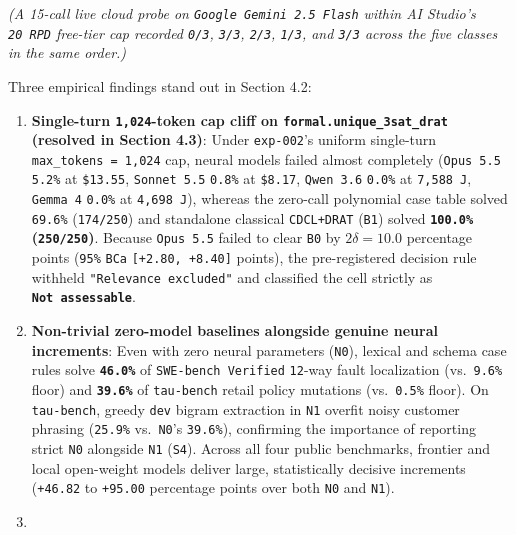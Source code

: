 \documentclass[10pt,letterpaper]{article}
\providecommand{\tightlist}{\setlength{\itemsep}{1pt}\setlength{\parskip}{0pt}}
\begin{document}
\emph{(A 15-call live cloud probe on \texttt{Google\ Gemini\ 2.\allowbreak{}5\ Flash}
within AI Studio's \texttt{20\ RPD} free-tier cap recorded \texttt{0/3},
\texttt{3/3}, \texttt{2/3}, \texttt{1/3}, and \texttt{3/3} across the
five classes in the same order.)}

Three empirical findings stand out in Section 4.2:

\begin{enumerate}
\def\labelenumi{\arabic{enumi}.}
\tightlist
\item
  \textbf{Single-turn \texttt{1,024}-token cap cliff on
  \texttt{formal.\allowbreak{}unique\_\allowbreak{}3sat\_\allowbreak{}drat} (resolved in Section 4.3)}: Under
  \texttt{exp-002}'s uniform single-turn \texttt{max\_\allowbreak{}tokens\ =\ 1,\allowbreak{}024}
  cap, neural models failed almost completely (\texttt{Opus\ 5.5}
  \texttt{5.2\%} at \texttt{\$13.55}, \texttt{Sonnet\ 5.\allowbreak{}5}
  \texttt{0.8\%} at \texttt{\$8.17}, \texttt{Qwen\ 3.6} \texttt{0.0\%}
  at \texttt{7,588\ J}, \texttt{Gemma\ 4} \texttt{0.0\%} at
  \texttt{4,698\ J}), whereas the zero-call polynomial case table solved
  \texttt{69.6\%} (\texttt{174/250}) and standalone classical
  \texttt{CDCL+DRAT} (\texttt{B1}) solved \textbf{\texttt{100.0\%}
  (\texttt{250/250})}. Because \texttt{Opus\ 5.5} failed to clear
  \texttt{B0} by \(2\delta = 10.0\) percentage points (\texttt{95\%}
  \texttt{BCa} \texttt{{[}+2.80,\ +8.40{]}} points), the pre-registered
  decision rule withheld \texttt{"Relevance\ excluded"} and classified
  the cell strictly as \textbf{\texttt{Not\ assessable}}.
\item
  \textbf{Non-trivial zero-model baselines alongside genuine neural
  increments}: Even with zero neural parameters (\texttt{N0}), lexical
  and schema case rules solve \textbf{\texttt{46.0\%}} of
  \texttt{SWE-\allowbreak{}bench\ Verified} \texttt{12}-way fault localization
  (vs.~\texttt{9.6\%} floor) and \textbf{\texttt{39.6\%}} of
  \texttt{tau-bench} retail policy mutations (vs.~\texttt{0.5\%} floor).
  On \texttt{tau-bench}, greedy \texttt{dev} bigram extraction in
  \texttt{N1} overfit noisy customer phrasing (\texttt{25.9\%}
  vs.~\texttt{N0}'s \texttt{39.6\%}), confirming the importance of
  reporting strict \texttt{N0} alongside \texttt{N1} (\texttt{S4}).
  Across all four public benchmarks, frontier and local open-weight
  models deliver large, statistically decisive increments
  (\texttt{+46.82} to \texttt{+95.00} percentage points over both
  \texttt{N0} and \texttt{N1}).
\item

\end{enumerate}
\end{document}
